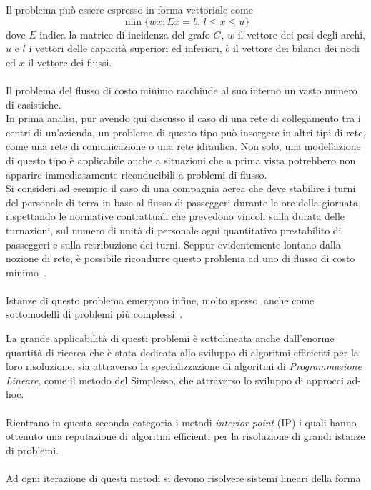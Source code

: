 Il problema può essere espresso in forma vettoriale come
\begin{equation}
\label{eqn:MCF-vect}
\min\{ wx : Ex = b,\, l \leq x \leq u \}
\end{equation}
dove $E$ indica la matrice di incidenza del grafo $G$, $w$ il vettore dei pesi degli archi, $u$ e $l$ i vettori delle capacità superiori ed inferiori, $b$ il vettore dei bilanci dei nodi ed $x$ il vettore dei flussi.\\
\\
Il problema del flusso di costo minimo racchiude al suo interno un vasto numero di casistiche.\\
In prima analisi, pur avendo qui discusso il caso di una rete di collegamento tra i centri di un'azienda, un problema di questo tipo può insorgere in altri tipi di rete, come una rete di comunicazione o una rete idraulica.
Non solo, una modellazione di questo tipo è applicabile anche a situazioni che a prima vista potrebbero non apparire immediatamente riconducibili a problemi di flusso.\\

Si consideri ad esempio il caso di una compagnia aerea che deve stabilire i turni del personale di terra in base al flusso di passeggeri durante le ore della giornata, rispettando le normative contrattuali che prevedono vincoli sulla durata delle turnazioni, sul numero di unità di personale ogni quantitativo prestabilito di passeggeri e sulla retribuzione dei turni.
Seppur evidentemente lontano dalla nozione di rete, è possibile ricondurre questo problema ad uno di flusso di costo minimo~\cite{Turni}.\\
\\
Istanze di questo problema emergono infine, molto spesso, anche come sottomodelli di problemi più complessi~\cite{MCF_appl}.


La grande applicabilità di questi problemi è sottolineata anche dall'enorme quantità di ricerca che è stata dedicata allo sviluppo di algoritmi efficienti per la loro risoluzione, sia attraverso la specializzazione di algoritmi di \emph{Programmazione Lineare}, come il metodo del Simplesso, che attraverso lo sviluppo di approcci ad-hoc.\\
\\
Rientrano in questa seconda categoria i metodi \emph{interior point} (IP) i quali hanno ottenuto una reputazione di algoritmi efficienti per la risoluzione di grandi istanze di problemi.\\
\\
Ad ogni iterazione di questi metodi si devono risolvere sistemi lineari della forma

